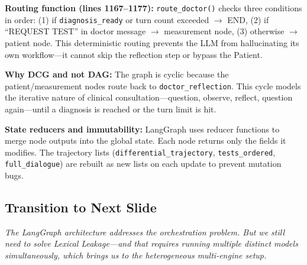 \documentclass[12pt]{article}
\begin{document}
{  \textbf{Routing function (lines 1167--1177):} \texttt{route\_doctor()} checks three conditions in order: (1) if \texttt{diagnosis\_ready} or turn count exceeded $\to$ END, (2) if ``REQUEST TEST'' in doctor message $\to$ measurement node, (3) otherwise $\to$ patient node. This deterministic routing prevents the LLM from hallucinating its own workflow---it cannot skip the reflection step or bypass the Patient.

  \textbf{Why DCG and not DAG:} The graph is cyclic because the patient/measurement nodes route back to \texttt{doctor\_reflection}. This cycle models the iterative nature of clinical consultation---question, observe, reflect, question again---until a diagnosis is reached or the turn limit is hit.

  \textbf{State reducers and immutability:} LangGraph uses reducer functions to merge node outputs into the global state. Each node returns only the fields it modifies. The trajectory lists (\texttt{differential\_trajectory}, \texttt{tests\_ordered}, \texttt{full\_dialogue}) are rebuilt as new lists on each update to prevent mutation bugs.
  }

  \subsection*{Transition to Next Slide}
  {\color{transgreen}
  \textit{The LangGraph architecture addresses the orchestration problem. But we still need to solve Lexical Leakage---and that requires running multiple distinct models simultaneously, which brings us to the heterogeneous multi-engine setup.}
  }
\end{document}
